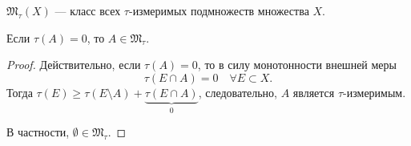 \begin{definition}
    $\mathfrak{M}_{\tau} (X)$ — класс всех $\tau$-измеримых подмножеств множества $X$.
\end{definition} 

\begin{lemma}
    Если $\tau(A) = 0$, то $A \in \mathfrak{M}_{\tau}$. 
\end{lemma}
\begin{proof}
    Действительно, если $\tau(A) = 0$, то в силу монотонности внешней меры $$\tau(E \cap A) = 0 \quad \forall E \subset X.$$
    Тогда $\tau(E) \geqslant \tau(E \setminus A) + \underbrace{\tau(E \cap A)}_{0}$, следовательно, $A$ является $\tau$-измеримым.

    В частности, $\emptyset \in \mathfrak{M}_{\tau}$.
\end{proof} 

